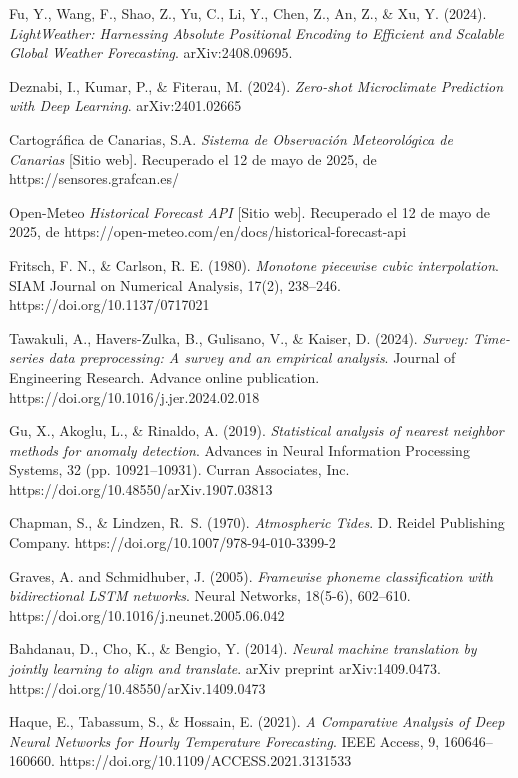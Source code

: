 \documentclass[spanish,a4paper,12pt,oneside]{extreport}
\begin{document}
\begin{thebibliography}{X}
Fu, Y., Wang, F., Shao, Z., Yu, C., Li, Y., Chen, Z., An, Z., \& Xu, Y. (2024). 
\emph{LightWeather: Harnessing Absolute Positional Encoding to Efficient and Scalable Global Weather Forecasting}. arXiv:2408.09695.

Deznabi, I., Kumar, P., \& Fiterau, M. (2024). \emph{Zero-shot Microclimate Prediction with Deep Learning}. arXiv:2401.02665

Cartográfica de Canarias, S.A. \emph{Sistema de Observación Meteorológica de Canarias} [Sitio web]. Recuperado el 12 de mayo de 2025, de https://sensores.grafcan.es/

Open-Meteo \emph{Historical Forecast API} [Sitio web]. Recuperado el 12 de mayo de 2025, de https://open-meteo.com/en/docs/historical-forecast-api

Fritsch, F. N., \& Carlson, R. E. (1980). \emph{Monotone piecewise cubic interpolation}. SIAM Journal on Numerical Analysis, 17(2), 238–246. https://doi.org/10.1137/0717021

Tawakuli, A., Havers-Zulka, B., Gulisano, V., \& Kaiser, D. (2024). \emph{Survey: Time-series data preprocessing: A survey and an empirical analysis}. Journal of Engineering Research. Advance online publication. https://doi.org/10.1016/j.jer.2024.02.018

Gu, X., Akoglu, L., \& Rinaldo, A. (2019). \emph{Statistical analysis of nearest neighbor methods for anomaly detection}. Advances in Neural Information Processing Systems, 32 (pp. 10921–10931). Curran Associates, Inc. https://doi.org/10.48550/arXiv.1907.03813

Chapman, S., \& Lindzen, R.~S. (1970). \textit{Atmospheric Tides}. D. Reidel Publishing Company. https://doi.org/10.1007/978-94-010-3399-2

Graves, A. and Schmidhuber, J. (2005). \textit{Framewise phoneme classification with bidirectional LSTM networks}. Neural Networks, 18(5-6), 602–610. https://doi.org/10.1016/j.neunet.2005.06.042

Bahdanau, D., Cho, K., \& Bengio, Y. (2014). \emph{Neural machine translation by jointly learning to align and translate}. arXiv preprint arXiv:1409.0473. https://doi.org/10.48550/arXiv.1409.0473

Haque, E., Tabassum, S., \& Hossain, E. (2021). \textit{A Comparative Analysis of Deep Neural Networks for Hourly Temperature Forecasting}. IEEE Access, 9, 160646–160660. https://doi.org/10.1109/ACCESS.2021.3131533

\end{thebibliography}
\end{document}
